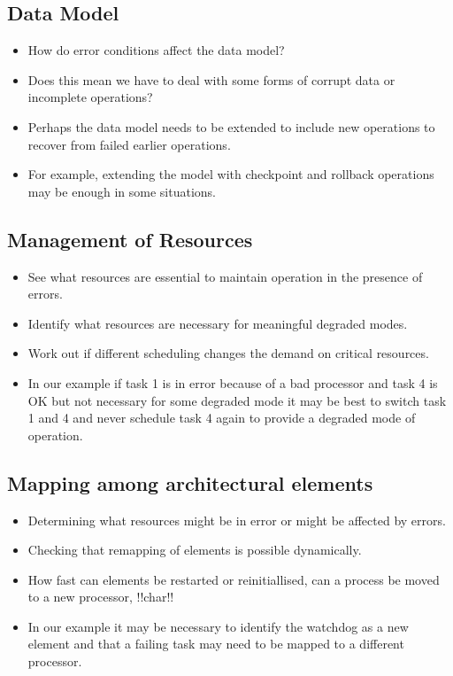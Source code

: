 \documentclass[a4paper]{report}
\begin{document}
\subsection{Data Model}
\begin{itemize}
\item{How do error conditions affect the data model?}
\item{Does this mean we have to deal with some forms of corrupt data or incomplete operations?}
\item{Perhaps the data model needs to be extended to include new operations to recover from failed earlier operations.}
\item{For example, extending the model with checkpoint and rollback operations may be enough in some situations.}
\end{itemize}

\subsection{Management of Resources}
\begin{itemize}
\item{See what resources are essential to maintain operation in the presence of errors.}
\item{Identify what resources are necessary for meaningful degraded modes.}
\item{Work out if different scheduling changes the demand on critical resources.}
\item{In our example if task 1 is in error because of a bad processor and task 4 is OK but not necessary for some degraded mode it may be best to switch task 1 and 4 and never schedule task 4 again to provide a degraded mode of operation.}
\end{itemize}

\subsection{Mapping among architectural elements}
\begin{itemize}
\item{Determining what resources might be in error or might be affected by errors.}
\item{Checking that remapping of elements is possible dynamically.}
\item{How fast can elements be restarted or reinitiallised, can a process be moved to a new processor, !!char!!}
\item{In our example it may be necessary to identify the watchdog as a new element and that a failing task may need to be mapped to a different processor.}
\end{itemize}
\end{document}
